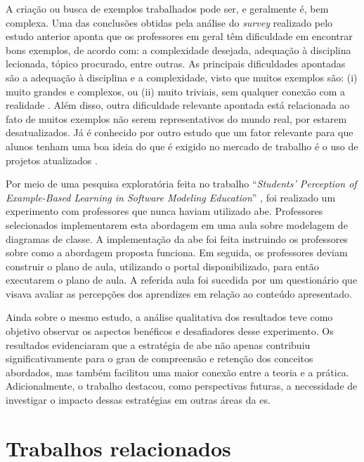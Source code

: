 A criação ou busca de exemplos trabalhados pode ser, e geralmente é,  bem complexa. Uma das conclusões obtidas pela análise do \textit{survey} realizado pelo estudo anterior aponta que os professores em geral têm dificuldade em encontrar bons exemplos, de acordo com: a complexidade desejada, adequação à disciplina lecionada, tópico procurado, entre outras. As principais dificuldades apontadas são a adequação à disciplina e a complexidade, visto que muitos exemplos são: (i) muito grandes e complexos, ou (ii) muito triviais, sem qualquer conexão com a realidade \cite{Simone.Tonhao-etal:2021}. Além disso, outra dificuldade relevante apontada está relacionada ao fato de muitos exemplos não serem representativos do mundo real, por estarem desatualizados. Já é conhecido por outro estudo que um fator relevante para que alunos tenham uma boa ideia do que é exigido no mercado de trabalho é o uso de projetos atualizados \cite{OSSProjects-TheProfessors'Perspective}.

Por meio de uma pesquisa exploratória feita no trabalho ``\textit{Students’ Perception of Example-Based Learning in Software Modeling Education}'' \cite{Tiago.Bonetti-etal:2023}, foi realizado um experimento com professores que nunca haviam utilizado \gls{abe}. Professores selecionados implementarem esta abordagem em uma aula sobre modelagem de diagramas de classe. A implementação da \gls{abe} foi feita instruindo os professores sobre como a abordagem proposta funciona. Em seguida, os professores deviam construir o plano de aula, utilizando o portal disponibilizado, para então executarem o plano de aula. A referida aula foi sucedida por um questionário que visava avaliar as percepções dos aprendizes em relação ao conteúdo apresentado. 

Ainda sobre o mesmo estudo, a análise qualitativa dos resultados teve como objetivo observar os aspectos benéficos e desafiadores desse experimento. Os resultados evidenciaram que a estratégia de \gls{abe} não apenas contribuiu significativamente para o grau de compreensão e retenção dos conceitos abordados, mas também facilitou uma maior conexão entre a teoria e a prática. Adicionalmente, o trabalho destacou, como perspectivas futuras, a necessidade de investigar o impacto dessas estratégias em outras áreas da \gls{es}.

\section{Trabalhos relacionados}
\label{section:related-work}


